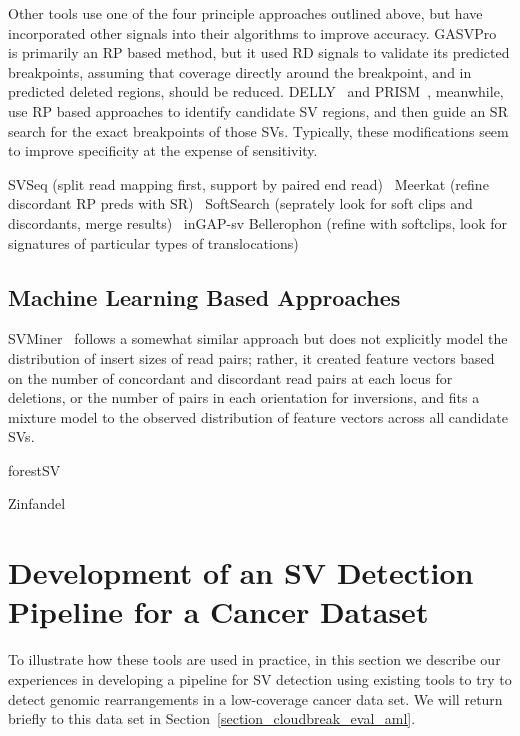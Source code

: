 Other tools use one of the four principle approaches outlined above, but have incorporated other signals into their algorithms to improve accuracy. GASVPro~\cite{Sindi:2012kk} is primarily an RP based method, but it used RD signals to validate its predicted breakpoints, assuming that coverage directly around the breakpoint, and in predicted deleted regions, should be reduced. DELLY~\cite{Rausch:2012he} and PRISM~\cite{Jiang:2012cp}, meanwhile, use RP based approaches to identify candidate SV regions, and then guide an SR search for the exact breakpoints of those SVs. Typically, these modifications seem to improve specificity at the expense of sensitivity.

SVSeq (split read mapping first, support by paired end read)~\cite{Zhang:2011ku}
Meerkat (refine discordant RP preds with SR)~\cite{Yang:2013ih}
SoftSearch (seprately look for soft clips and discordants, merge results)~\cite{Hart:2013fv}
inGAP-sv
Bellerophon (refine with softclips, look for signatures of particular types of translocations)

\subsection{Machine Learning Based Approaches}

SVMiner~\cite{Hayes:2012ia} follows a somewhat similar approach but does not explicitly model the distribution of insert sizes of read pairs; rather, it created feature vectors based on the number of concordant and discordant read pairs at each locus for deletions, or the number of pairs in each orientation for inversions, and fits a mixture model to the observed distribution of feature vectors across all candidate SVs.

forestSV

Zinfandel

\section{Development of an SV Detection Pipeline for a Cancer Dataset}\label{section_aml_pipeline}

To illustrate how these tools are used in practice, in this section we describe our experiences in developing a pipeline for SV detection using existing tools to try to detect genomic rearrangements in a low-coverage cancer data set. We will return briefly to this data set in Section~\ref{section_cloudbreak_eval_aml}.

